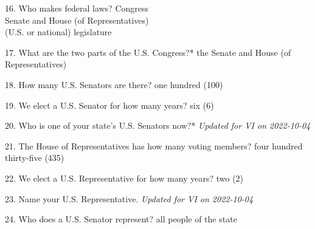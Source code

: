 \documentclass[avery5371,frame]{flashcards}
\begin{document}
        \begin{flashcard}{16. Who makes federal laws?}
        {Congress\\Senate and House (of Representatives)\\(U.S. or national) legislature}
        \end{flashcard}
        \begin{flashcard}{17. What are the two parts of the U.S. Congress?*}
        {the Senate and House (of Representatives)}
        \end{flashcard}
        \begin{flashcard}{18. How many U.S. Senators are there?}
        {one hundred (100)}
        \end{flashcard}
        \begin{flashcard}{19. We elect a U.S. Senator for how many years?}
        {six (6)}
        \end{flashcard}
        \begin{flashcard}{20. Who is one of your state’s U.S. Senators now?*}
        {{\footnotesize{\textsl{Updated for VI on 2022-10-04}}}}
        \end{flashcard}
        \begin{flashcard}{21. The House of Representatives has how many voting members?}
        {four hundred thirty-five (435)}
        \end{flashcard}
        \begin{flashcard}{22. We elect a U.S. Representative for how many years?}
        {two (2)}
        \end{flashcard}
        \begin{flashcard}{23. Name your U.S. Representative.}
        {{\footnotesize{\textsl{Updated for VI on 2022-10-04}}}}
        \end{flashcard}
        \begin{flashcard}{24. Who does a U.S. Senator represent?}
        {all people of the state}
        \end{flashcard}
\end{document}
